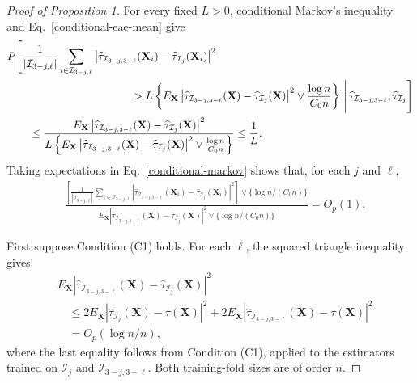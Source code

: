 \documentclass[11pt]{article}
\theoremstyle{referenceplain}
\theoremstyle{referencedefinition}
\theoremstyle{referenceremark}
\begin{document}
\begin{proof}[Proof of Proposition 1]
For every fixed $L>0$, conditional Markov's inequality and
Eq.~\eqref{conditional-eae-mean} give
\begin{align}
&P\Bigg[
\frac{1}{|\mathcal I_{3-j,\ell}|}
\sum_{i\in\mathcal I_{3-j,\ell}}
\left|
\widehat\tau_{\mathcal I_{3-j,3-\ell}}(\mathbf X_i)
-\widehat\tau_{\mathcal I_j}(\mathbf X_i)
\right|^2
\notag\\
&\hspace{40mm}>
L\left\{
E_{\mathbf X}\left|
\widehat\tau_{\mathcal I_{3-j,3-\ell}}(\mathbf X)
-\widehat\tau_{\mathcal I_j}(\mathbf X)
\right|^2
\vee\frac{\log n}{{C_0}n}
\right\}
\,\Bigg|\,
\widehat\tau_{\mathcal I_{3-j,3-\ell}},
\widehat\tau_{\mathcal I_j}
\Bigg]
\notag\\
&\qquad\le
\frac{
E_{\mathbf X}\left|
\widehat\tau_{\mathcal I_{3-j,3-\ell}}(\mathbf X)
-\widehat\tau_{\mathcal I_j}(\mathbf X)
\right|^2
}{
L\left\{
E_{\mathbf X}\left|
\widehat\tau_{\mathcal I_{3-j,3-\ell}}(\mathbf X)
-\widehat\tau_{\mathcal I_j}(\mathbf X)
\right|^2
\vee\frac{\log n}{{C_0}n}
\right\}
}
\le\frac1L.
\label{conditional-markov}
\end{align}
Taking expectations in Eq.~\eqref{conditional-markov} shows that, for
each $j$ and $\ell$,
\begin{align}
&
\frac{
\left[
\displaystyle
\frac{1}{|\mathcal I_{3-j,\ell}|}
\sum_{i\in\mathcal I_{3-j,\ell}}
\left|
\widehat\tau_{\mathcal I_{3-j,3-\ell}}(\mathbf X_i)
-\widehat\tau_{\mathcal I_j}(\mathbf X_i)
\right|^2
\right]\vee\{\log n/({C_0}n)\}
}{
E_{\mathbf X}\left|
\widehat\tau_{\mathcal I_{3-j,3-\ell}}(\mathbf X)
-\widehat\tau_{\mathcal I_j}(\mathbf X)
\right|^2
\vee\{\log n/({C_0}n)\}
}
=O_p(1).
\label{empirical-to-conditional}
\end{align}

First suppose Condition (C1) holds. For each $\ell$, the squared
triangle inequality gives
\begin{align*}
&E_{\mathbf X}\left|
\widehat\tau_{\mathcal I_{3-j,3-\ell}}(\mathbf X)
-\widehat\tau_{\mathcal I_j}(\mathbf X)
\right|^2\\
&\quad\le
2E_{\mathbf X}\left|
\widehat\tau_{\mathcal I_j}(\mathbf X)-\tau(\mathbf X)
\right|^2
+
2E_{\mathbf X}\left|
\widehat\tau_{\mathcal I_{3-j,3-\ell}}(\mathbf X)-\tau(\mathbf X)
\right|^2\\
&\quad=
O_p(\log n/n),
\end{align*}
where the last equality follows from Condition (C1), applied to the
estimators trained on $\mathcal I_j$ and
$\mathcal I_{3-j,3-\ell}$. Both training-fold sizes are of order $n$.


\end{proof}
\end{document}
